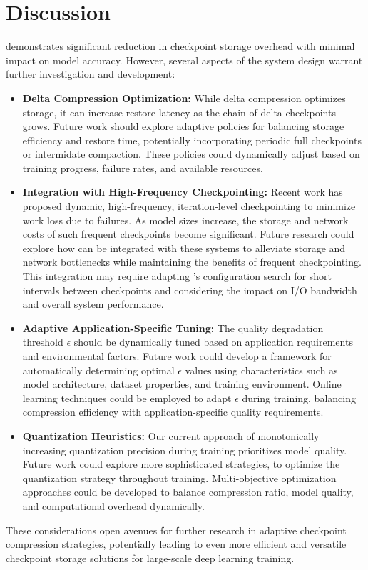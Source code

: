 \section{Discussion}
\label{sec:discussion}

\sys demonstrates significant reduction in checkpoint storage overhead with minimal impact on model accuracy. However, several aspects of the system design warrant further investigation and development:

\begin{itemize}[leftmargin=*]
    \item \textbf{Delta Compression Optimization:} While delta compression optimizes storage, it can increase restore latency as the chain of delta checkpoints grows. Future work should explore adaptive policies for balancing storage efficiency and restore time, potentially incorporating periodic full checkpoints or intermidate compaction. These policies could dynamically adjust based on training progress, failure rates, and available resources.

    \item \textbf{Integration with High-Frequency Checkpointing:} Recent work \cite{checkfreq} has proposed dynamic, high-frequency, iteration-level checkpointing to minimize work loss due to failures. As model sizes increase, the storage and network costs of such frequent checkpoints become significant. Future research could explore how \sys can be integrated with these systems to alleviate storage and network bottlenecks while maintaining the benefits of frequent checkpointing. This integration may require adapting \sys's configuration search for short intervals between checkpoints and considering the impact on I/O bandwidth and overall system performance.

    \item \textbf{Adaptive Application-Specific Tuning:} The quality degradation threshold $\epsilon$ should be dynamically tuned based on application requirements and environmental factors. Future work could develop a framework for automatically determining optimal $\epsilon$ values using characteristics such as model architecture, dataset properties, and training environment. Online learning techniques could be employed to adapt $\epsilon$ during training, balancing compression efficiency with application-specific quality requirements.

    \item \textbf{Quantization Heuristics:} Our current approach of monotonically increasing quantization precision during training prioritizes model quality. Future work could explore more sophisticated strategies, to optimize the quantization strategy throughout training. Multi-objective optimization approaches could be developed to balance compression ratio, model quality, and computational overhead dynamically.
\end{itemize}

These considerations open avenues for further research in adaptive checkpoint compression strategies, potentially leading to even more efficient and versatile checkpoint storage solutions for large-scale deep learning training.



    
    

    






    

